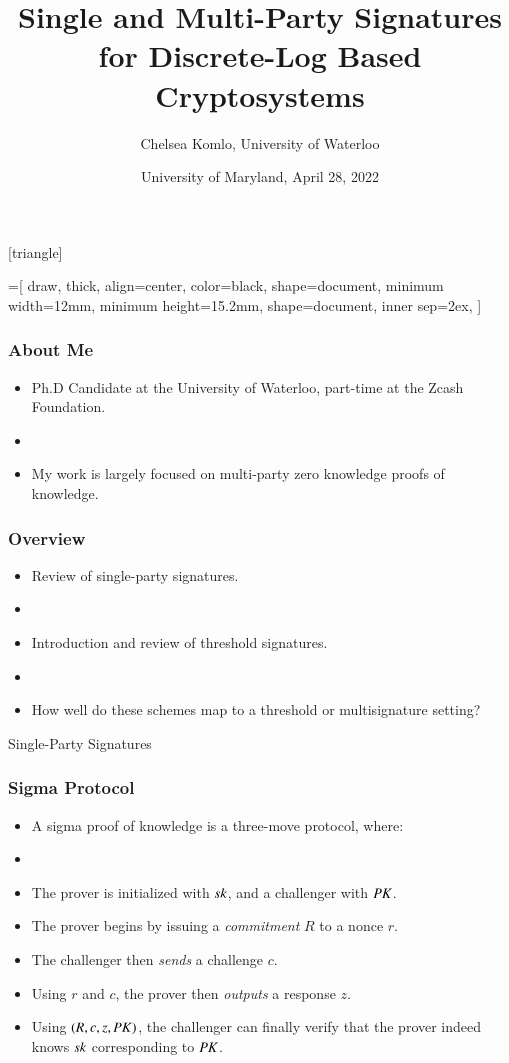 \documentclass[hyperref={pdfpagelabels=true},table,dvipsnames,14pt,aspectratio=169]{beamer}
\title[Signatures for Discrete Logarithm Based Cryptosystems]{Single and Multi-Party Signatures for Discrete-Log Based Cryptosystems}
\author{Chelsea Komlo, University of Waterloo}
\date[April 2022]{ University of Maryland, April 28, 2022}
\begin{document}
[triangle]

=[%
draw,
thick,
align=center,
color=black,
shape=document,
minimum width=12mm,
minimum height=15.2mm,
shape=document,
inner sep=2ex,
]

\begin{frame}
        \thispagestyle{empty}
        \maketitle
\end{frame}

\begin{frame}
  \frametitle{About Me}

  \begin{itemize}
    \item<1-> Ph.D Candidate at the University of Waterloo, part-time at the Zcash Foundation. 
    \item[]
    \item<1-> My work is largely focused on multi-party zero knowledge proofs of knowledge. 
  \end{itemize}
\end{frame}

\begin{frame}
  \frametitle{Overview}

  \begin{itemize}
    \item<1-> Review of single-party signatures.
    \item[]
    \item<2-> Introduction and review of threshold signatures. 
    \item[]
    \item<3-> How well do these schemes map to a threshold or multisignature setting? 
  \end{itemize}
\end{frame}

\begin{frame}
  \huge 
  Single-Party Signatures 
\end{frame}

\begin{frame}
  \frametitle{Sigma Protocol}

  \begin{itemize}
    \item<1-> A sigma proof of knowledge is a three-move protocol, where:
    \item[]
    \item<2->[1.] The prover is initialized with $\mathit{sk}$, and a challenger with $\mathit{PK}$. 
    \item<3->[2.] The prover begins by issuing a \emph{commitment} $R$ to a nonce $r$.
    \item<4->[3.] The challenger then \emph{sends} a challenge $c$. 
    \item<5->[4.] Using $r$ and $c$, the prover then \emph{outputs} a response $z$. 
    \item<6->[5.] Using $(R, c,z, \mathit{PK})$, the challenger can finally verify that the prover indeed knows $\mathit{sk}$ corresponding to $\mathit{PK}$.
  \end{itemize}
\end{frame}
\end{document}
